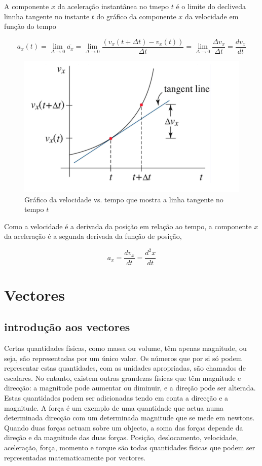 \documentclass[
  portuguese,
  ]{book}
\begin{document}
A componente \(x\) da aceleração instantânea no tmepo \(t\) é o limite do decliveda linnha tangente no instante \(t\) do gráfico da componente \(x\) da velocidade em função do tempo

\[a_x(t)=\lim_{\Delta \rightarrow 0}\overline{a_x}=\lim_{\Delta \rightarrow 0}\frac{(v_x(t+\Delta t)-v_x(t))}{\Delta t}=\lim_{\Delta \rightarrow 0}\frac{\Delta v_x}{\Delta t}=\frac{dv_x}{dt}\]

\begin{figure}

{\centering \includegraphics[width=0.5\linewidth]{img/5} 

}

\caption{Gráfico da velocidade vs. tempo que mostra a linha tangente no tempo $t$}\label{fig:img5}
\end{figure}

Como a velocidade é a derivada da posição em relação ao tempo, a componente \(x\) da aceleração é a segunda derivada da função de posição,

\[a_x=\frac{dv_x}{dt}=\frac{d^2x}{dt}\]

\hypertarget{vectores}{%
\chapter{Vectores}\label{vectores}}

\hypertarget{introduuxe7uxe3o-aos-vectores}{%
\section{introdução aos vectores}\label{introduuxe7uxe3o-aos-vectores}}

Certas quantidades físicas, como massa ou volume, têm apenas magnitude, ou seja, são representadas por um único valor. Os números que por si só podem representar estas quantidades, com as unidades apropriadas, são chamados de escalares. No entanto, existem outras grandezas físicas que têm magnitude e direcção: a magnitude pode aumentar ou diminuir, e a direção pode ser alterada. Estas quantidades podem ser adicionadas tendo em conta a direcção e a magnitude. A força é um exemplo de uma quantidade que actua numa determinada direcção com um determinada magnitude que se mede em newtons. Quando duas forças actuam sobre um objecto, a soma das forças depende da direção e da magnitude das duas forças. Posição, deslocamento, velocidade, aceleração, força, momento e torque são todas quantidades físicas que podem ser representadas matematicamente por vectores.
\end{document}
